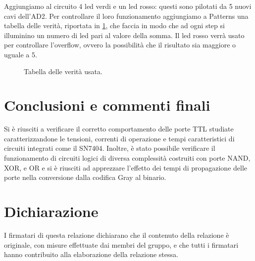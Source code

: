 \documentclass[10pt, a4paper, italian]{article}
\begin{document}
Aggiungiamo al circuito 4 led verdi e un led rosso: questi sono pilotati da 5 nuovi cavi dell'AD2. Per controllare il loro funzionamento aggiungiamo a Patterns una tabella delle verità, riportata in \cref{fig: Ver}, che faccia in modo che ad ogni step si illuminino un numero di led pari al valore della somma. Il led rosso verrà usato per controllare l'overflow, ovvero la possibilità che il risultato sia maggiore o uguale a 5.

\begin{figure}[htbp]
    \centering
    \caption{Tabella delle verità usata.}
    \label{fig: Ver}
\end{figure}


\section*{Conclusioni e commenti finali}
Si è riusciti a verificare il corretto comportamento delle porte TTL studiate
caratterizzandone le tensioni, correnti di operazione e tempi caratteristici
di circuiti integrati come il SN7404.
Inoltre, è stato possibile verificare il funzionamento di circuiti logici di
diversa complessità costruiti con porte NAND, XOR, e OR e si è riusciti ad
apprezzare l'effetto dei tempi di propagazione delle porte nella conversione
dalla codifica Gray al binario.

\section*{Dichiarazione}
I firmatari di questa relazione dichiarano che il contenuto della relazione \`e
originale, con misure effettuate dai membri del gruppo, e che tutti i firmatari
hanno contribuito alla elaborazione della relazione stessa.
\end{document}
